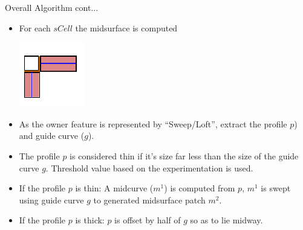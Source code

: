 \begin{frame}{Overall Algorithm cont...}
\begin{itemize}[noitemsep,label=\textbullet,topsep=2pt,parsep=2pt,partopsep=2pt]
\item For each $sCell$ the midsurface is computed

\vspace{-3mm}

	\includegraphics[width=0.25\linewidth]{../Common/images/MidsurfPatches.pdf}	
	
\vspace{-3mm}	

\item As the owner feature is represented by ``Sweep/Loft'', extract the profile $p$) and guide curve ($g$).
\item The profile $p$ is considered thin if it's size far less than the size of the guide curve $g$.  Threshold value based on the experimentation is used.
	\item If the profile $p$ is thin: A midcurve ($m^1$) is computed from $p$, $m^1$ is swept using guide curve $g$ to generated midsurface patch $m^2$.
	\item If the profile $p$ is thick: $p$ is offset by half of $g$ so as to lie midway. 
\end{itemize}
\end{frame}

